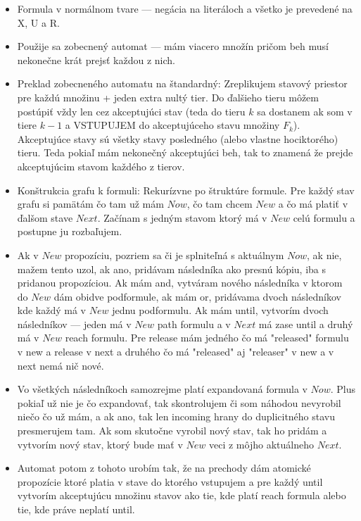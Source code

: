 \documentclass[paper=a4, fontsize=11pt]{scrartcl} %
\numberwithin{equation}{section} %
\numberwithin{figure}{section} %
\numberwithin{table}{section} %
\begin{document}
	\begin{itemize}
		\item Formula v normálnom tvare — negácia na literáloch a všetko je prevedené na X, U a R.
		\item Použije sa zobecnený automat — mám viacero množín pričom beh musí nekonečne krát prejsť každou z nich.
		\item Preklad zobecneného automatu na štandardný: Zreplikujem stavový priestor pre každú množinu + jeden extra nultý tier. Do ďalšieho tieru môžem postúpiť vždy len cez akceptujúci stav (teda do tieru $k$ sa dostanem ak som v tiere $k-1$ a VSTUPUJEM do akceptujúceho stavu množiny $F_k$). Akceptujúce stavy sú všetky stavy posledného (alebo vlastne hociktorého) tieru. Teda pokiaľ mám nekonečný akceptujúci beh, tak to znamená že prejde akceptujúcim stavom každého z tierov.
		
		\item Konštrukcia grafu k formuli: Rekurízvne po štruktúre formule. Pre každý stav grafu si pamätám čo tam už mám $Now$, čo tam chcem $New$ a čo má platiť v ďalšom stave $Next$. Začínam s jedným stavom ktorý má v $New$ celú formulu a postupne ju rozbaľujem.
		
		\item Ak v $New$ propozíciu, pozriem sa či je splniteľná s aktuálnym $Now$, ak nie, mažem tento uzol, ak ano, pridávam následníka ako presnú kópiu, iba s pridanou propozíciou. Ak mám and, vytváram nového následníka v ktorom do $New$ dám obidve podformule, ak mám or, pridávama dvoch následníkov kde každý má v $New$ jednu podformulu. Ak mám until, vytvorím dvoch následníkov — jeden má v $New$ path formulu a v $Next$ má zase until a druhý má v $New$ reach formulu. Pre release mám jedného čo má "released" formulu v new a release v next a druhého čo má "released" aj "releaser" v new a v next nemá nič nové.
		\item Vo všetkých následníkoch samozrejme platí expandovaná formula v $Now$. Plus pokiaľ už nie je čo expandovať, tak skontrolujem či som náhodou nevyrobil niečo čo už mám, a ak ano, tak len incoming hrany do duplicitného stavu presmerujem tam. Ak som skutočne vyrobil nový stav, tak ho pridám a vytvorím nový stav, ktorý bude mať v $New$ veci z môjho aktuálneho $Next$.
		
		\item Automat potom z tohoto urobím tak, že na prechody dám atomické propozície ktoré platia v stave do ktorého vstupujem a pre každý until vytvorím akceptujúcu množinu stavov ako tie, kde platí reach formula alebo tie, kde práve neplatí until.
	\end{itemize}
\end{document}

